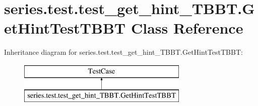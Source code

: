 \hypertarget{classseries_1_1test_1_1test__get__hint___t_b_b_t_1_1_get_hint_test_t_b_b_t}{}\section{series.\+test.\+test\+\_\+get\+\_\+hint\+\_\+\+T\+B\+B\+T.\+Get\+Hint\+Test\+T\+B\+BT Class Reference}
\label{classseries_1_1test_1_1test__get__hint___t_b_b_t_1_1_get_hint_test_t_b_b_t}
Inheritance diagram for series.\+test.\+test\+\_\+get\+\_\+hint\+\_\+\+T\+B\+B\+T.\+Get\+Hint\+Test\+T\+B\+BT\+:\begin{figure}[H]
\begin{center}
\leavevmode
\includegraphics[height=2.000000cm]{classseries_1_1test_1_1test__get__hint___t_b_b_t_1_1_get_hint_test_t_b_b_t}
\end{center}
\end{figure}
